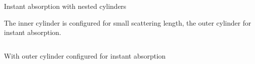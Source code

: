 
\begin{frame}[fragile]{Instant absorption with nested cylinders}

  The inner cylinder is configured for small scattering length, the outer cylinder for instant absorption. \\

  \begin{columns}
    \begin{column}{0.5\textwidth}


      With outer cylinder configured for instant absorption

    \end{column}
    \begin{column}{0.5\textwidth}


    \end{column}
  \end{columns}


\end{frame}
